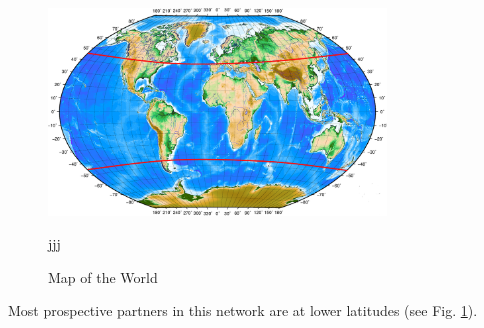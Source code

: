\begin{figure}
  \begin{center}
    \includegraphics[width=0.8\textwidth]{Figures/verdenskart}
  \end{center}
  \caption[world]{Map of the World}
jjj
  \label{fig:world}
\end{figure}

Most prospective partners in this network are at lower latitudes (see Fig.  \ref{fig:world}).



